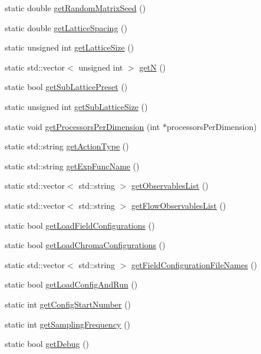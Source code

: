 \begin{DoxyCompactItemize}
\item 
static double \mbox{\hyperlink{class_parameters_a92d9e73e333b01745747e55d9ae4f7cc}{get\+Random\+Matrix\+Seed}} ()
\item 
static double \mbox{\hyperlink{class_parameters_aabe7e3a2468cf11bb5e98e626cb94ff2}{get\+Lattice\+Spacing}} ()
\item 
static unsigned int \mbox{\hyperlink{class_parameters_a128ccc4cb31e9930a825cfd3b8e83d2e}{get\+Lattice\+Size}} ()
\item 
static std\+::vector$<$ unsigned int $>$ \mbox{\hyperlink{class_parameters_a41e524d54a2e4b2448b61d16ef46f534}{getN}} ()
\item 
static bool \mbox{\hyperlink{class_parameters_ab9d9f206373cdad11d48ab08222204e3}{get\+Sub\+Lattice\+Preset}} ()
\item 
static unsigned int \mbox{\hyperlink{class_parameters_aff629ab94d99807364926008fb4e1e67}{get\+Sub\+Lattice\+Size}} ()
\item 
static void \mbox{\hyperlink{class_parameters_a6b13faa642ebaf458203ae111a536d7a}{get\+Processors\+Per\+Dimension}} (int $\ast$processors\+Per\+Dimension)
\item 
static std\+::string \mbox{\hyperlink{class_parameters_afc824aec2ab48afe06829050d0fbe966}{get\+Action\+Type}} ()
\item 
static std\+::string \mbox{\hyperlink{class_parameters_a9fa8d9376dcba8e98b3fff764e1059d7}{get\+Exp\+Func\+Name}} ()
\item 
static std\+::vector$<$ std\+::string $>$ \mbox{\hyperlink{class_parameters_a5153ee54f768139539ebd3cc1a6f497d}{get\+Observables\+List}} ()
\item 
static std\+::vector$<$ std\+::string $>$ \mbox{\hyperlink{class_parameters_a7f1edc3384a46b6e4fc5e380a8fe6d41}{get\+Flow\+Observables\+List}} ()
\item 
static bool \mbox{\hyperlink{class_parameters_a5a11841ee32f68ebd27a8146a3fda07b}{get\+Load\+Field\+Configurations}} ()
\item 
static bool \mbox{\hyperlink{class_parameters_a35eef818713a6f5ae20d67e7d64bec2f}{get\+Load\+Chroma\+Configurations}} ()
\item 
static std\+::vector$<$ std\+::string $>$ \mbox{\hyperlink{class_parameters_a3ed137b5c7d4271b470df14ee2557004}{get\+Field\+Configuration\+File\+Names}} ()
\item 
static bool \mbox{\hyperlink{class_parameters_a7870fae41b172caee9fa020c86d056ac}{get\+Load\+Config\+And\+Run}} ()
\item 
static int \mbox{\hyperlink{class_parameters_a58f15668b37e705d34d6588e287e4bc0}{get\+Config\+Start\+Number}} ()
\item 
static int \mbox{\hyperlink{class_parameters_a3b4e197b2569fb5465e0827430e45eb5}{get\+Sampling\+Frequency}} ()
\item 
static bool \mbox{\hyperlink{class_parameters_a265e274127b6d845e43c66d94463f051}{get\+Debug}} ()
\end{DoxyCompactItemize}

